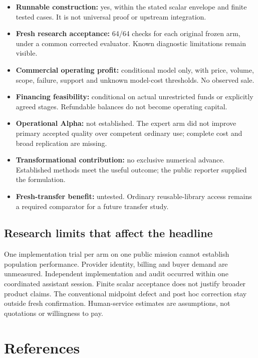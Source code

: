 \documentclass[
  10pt,
]{article}
\providecommand{\tightlist}{%
  \setlength{\itemsep}{0pt}\setlength{\parskip}{0pt}}
\begin{document}
\begin{itemize}
\tightlist
\item
  \textbf{Runnable construction:} yes, within the stated scalar envelope
  and finite tested cases. It is not universal proof or upstream
  integration.
\item
  \textbf{Fresh research acceptance:} 64/64 checks for each original
  frozen arm, under a common corrected evaluator. Known diagnostic
  limitations remain visible.
\item
  \textbf{Commercial operating profit:} conditional model only, with
  price, volume, scope, failure, support and unknown model-cost
  thresholds. No observed sale.
\item
  \textbf{Financing feasibility:} conditional on actual unrestricted
  funds or explicitly agreed stages. Refundable balances do not become
  operating capital.
\item
  \textbf{Operational Alpha:} not established. The expert arm did not
  improve primary accepted quality over competent ordinary use; complete
  cost and broad replication are missing.
\item
  \textbf{Transformational contribution:} no exclusive numerical
  advance. Established methods meet the useful outcome; the public
  reporter supplied the formulation.
\item
  \textbf{Fresh-transfer benefit:} untested. Ordinary reusable-library
  access remains a required comparator for a future transfer study.
\end{itemize}

\hypertarget{research-limits-that-affect-the-headline}{%
\subsection{Research limits that affect the
headline}\label{research-limits-that-affect-the-headline}}

One implementation trial per arm on one public mission cannot establish
population performance. Provider identity, billing and buyer demand are
unmeasured. Independent implementation and audit occurred within one
coordinated assistant session. Finite scalar acceptance does not justify
broader product claims. The conventional midpoint defect and post hoc
correction stay outside fresh confirmation. Human-service estimates are
assumptions, not quotations or willingness to pay.

\clearpage

\hypertarget{references}{%
\section{References}\label{references}}
\end{document}
